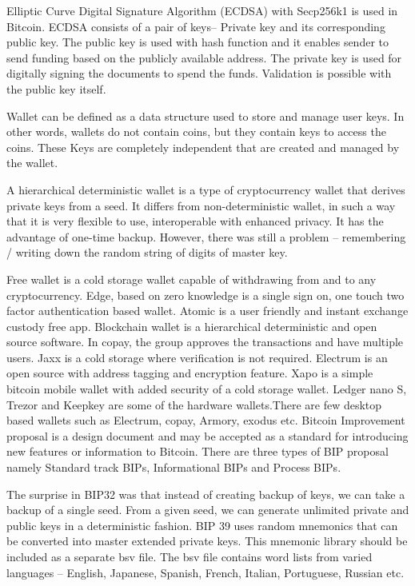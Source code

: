\documentclass[12pt]{article}
\begin{document}
Elliptic Curve Digital Signature Algorithm (ECDSA)
with Secp256k1 is used in Bitcoin. ECDSA consists of
a pair of keys– Private key and its corresponding public
key. The public key is used with hash function and it
enables sender to send funding based on the publicly
available address. The private key is used for digitally
signing the documents to spend the funds. Validation is
possible with the public key itself.\par
 Wallet can be defined as a data structure used to store
and manage user keys. In other words, wallets do not
contain coins, but they contain keys to access the coins.
These Keys are completely independent that are created
and managed by the wallet.\par
 A hierarchical deterministic wallet  is a type of
cryptocurrency wallet that derives private keys from a
seed. It differs from non-deterministic wallet, in such a
way that it is very flexible to use, interoperable with
enhanced privacy. It has the advantage of one-time
backup. However, there was still a problem –
remembering / writing down the random string of digits of
master key.\par
 Free wallet is a cold storage wallet capable of
withdrawing from and to any cryptocurrency. Edge,
based on zero knowledge is a single sign on, one touch
two factor authentication based wallet. Atomic is a user
friendly and instant exchange custody free app.
Blockchain wallet is a hierarchical deterministic and open
source software. In copay, the group approves the
transactions and have multiple users. Jaxx is a cold
storage where verification is not required. Electrum is an
open source with address tagging and encryption feature.
Xapo is a simple bitcoin mobile wallet with added
security of a cold storage wallet. Ledger nano S, Trezor
and Keepkey are some of the hardware wallets.There are
few desktop based wallets such as Electrum, copay,
Armory, exodus etc. 
Bitcoin Improvement proposal is a design document
and may be accepted as a standard for introducing new
features or information to Bitcoin. There are three types
of BIP proposal namely Standard track BIPs,
Informational BIPs and Process BIPs.\par
 The surprise in BIP32 was that instead of creating
backup of keys, we can take a backup of a single seed.
From a given seed, we can generate unlimited private and
public keys in a deterministic fashion. 
 BIP 39 uses random mnemonics that can be converted
into master extended private keys. This mnemonic library
should be included as a separate bsv file. The bsv file
contains word lists from varied languages – English,
Japanese, Spanish, French, Italian, Portuguese, Russian
etc.
\end{document}
